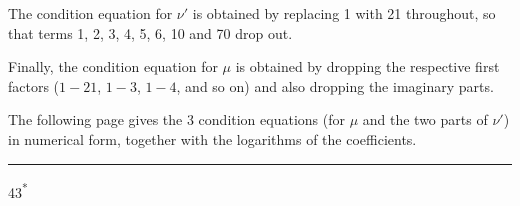 The condition equation for \(\nu'\) is obtained by replacing 1 with 21 throughout, so that terms 1, 2, 3, 4, 5, 6, 10 and 70 drop out.

Finally, the condition equation for \(\mu\) is obtained by dropping the respective first factors (\(1-21\), \(1-3\), \(1-4\), and so on) and also dropping the imaginary parts.

The following page gives the 3 condition equations (for \(\mu\) and the two parts of \(\nu'\)) in numerical form, together with the logarithms of the coefficients.
\begin{center}\rule{.18\linewidth}{.4pt}\end{center}
\par\vfill\noindent\hfill43\textsuperscript{*}
